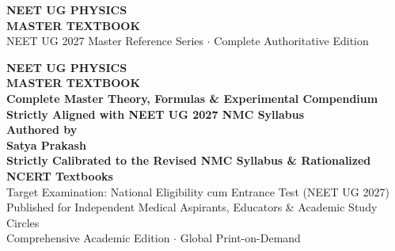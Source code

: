 \documentclass[10pt,twoside,openright]{book}
\begin{document}
\frontmatter

\thispagestyle{empty}
\vspace*{4cm}
\begin{center}
  {\Huge\bfseries\color{primarydark} NEET UG PHYSICS}\\[0.6cm]
  {\Large\bfseries\color{accentblue} MASTER TEXTBOOK}\\[1.5cm]
  {\normalsize\color{gray} NEET UG 2027 Master Reference Series $\cdot$ Complete Authoritative Edition}
\end{center}
\cleardoublepage

\thispagestyle{empty}
\vspace*{2cm}
\begin{center}
  {\Huge\bfseries\color{primarydark} NEET UG PHYSICS}\\[0.4cm]
  {\LARGE\bfseries\color{primarydark} MASTER TEXTBOOK}\\[0.8cm]
  {\Large\bfseries\color{accentblue} Complete Master Theory, Formulas \& Experimental Compendium}\\[0.3cm]
  {\large\bfseries\color{accentblue} Strictly Aligned with NEET UG 2027 NMC Syllabus}\\[2cm]
  
  {\large\textbf{Authored by}}\\[0.3cm]
  {\LARGE\bfseries\color{primarydark} Satya Prakash}\\[1.5cm]

  {\normalsize\textbf{Strictly Calibrated to the Revised NMC Syllabus \& Rationalized NCERT Textbooks}}\\[0.3cm]
  {\small Target Examination: National Eligibility cum Entrance Test (NEET UG 2027)}\\[2.5cm]

  {\footnotesize Published for Independent Medical Aspirants, Educators \& Academic Study Circles}\\[0.2cm]
  {\footnotesize Comprehensive Academic Edition $\cdot$ Global Print-on-Demand}
\end{center}
\cleardoublepage
\end{document}

